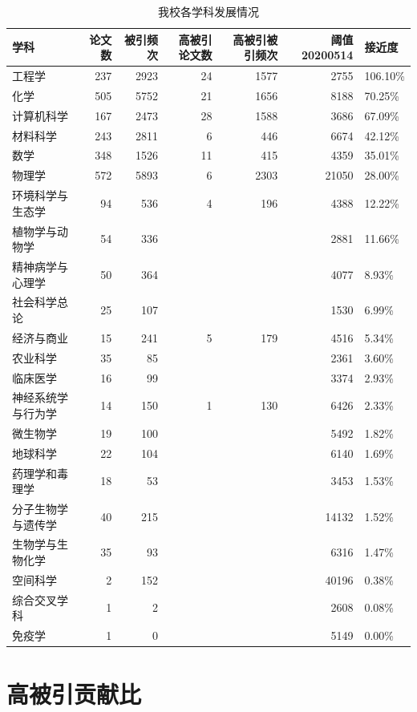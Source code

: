 \documentclass[cn, 11pt, fancy, hide]{elegantbook}
\begin{document}
\begin{table}[!h]

\caption{\label{tab:unnamed-chunk-23}我校各学科发展情况}
\centering
\begin{tabular}[t]{lrrrrrl}
\toprule
学科 & 论文数 & 被引频次 & 高被引论文数 & 高被引被引频次 & 阈值20200514 & 接近度\\
\midrule
工程学 & 237 & 2923 & 24 & 1577 & 2755 & 106.10\%\\
化学 & 505 & 5752 & 21 & 1656 & 8188 & 70.25\%\\
计算机科学 & 167 & 2473 & 28 & 1588 & 3686 & 67.09\%\\
材料科学 & 243 & 2811 & 6 & 446 & 6674 & 42.12\%\\
数学 & 348 & 1526 & 11 & 415 & 4359 & 35.01\%\\
\addlinespace
物理学 & 572 & 5893 & 6 & 2303 & 21050 & 28.00\%\\
环境科学与生态学 & 94 & 536 & 4 & 196 & 4388 & 12.22\%\\
植物学与动物学 & 54 & 336 &  &  & 2881 & 11.66\%\\
精神病学与心理学 & 50 & 364 &  &  & 4077 & 8.93\%\\
社会科学总论 & 25 & 107 &  &  & 1530 & 6.99\%\\
\addlinespace
经济与商业 & 15 & 241 & 5 & 179 & 4516 & 5.34\%\\
农业科学 & 35 & 85 &  &  & 2361 & 3.60\%\\
临床医学 & 16 & 99 &  &  & 3374 & 2.93\%\\
神经系统学与行为学 & 14 & 150 & 1 & 130 & 6426 & 2.33\%\\
微生物学 & 19 & 100 &  &  & 5492 & 1.82\%\\
\addlinespace
地球科学 & 22 & 104 &  &  & 6140 & 1.69\%\\
药理学和毒理学 & 18 & 53 &  &  & 3453 & 1.53\%\\
分子生物学与遗传学 & 40 & 215 &  &  & 14132 & 1.52\%\\
生物学与生物化学 & 35 & 93 &  &  & 6316 & 1.47\%\\
空间科学 & 2 & 152 &  &  & 40196 & 0.38\%\\
\addlinespace
综合交叉学科 & 1 & 2 &  &  & 2608 & 0.08\%\\
免疫学 & 1 & 0 &  &  & 5149 & 0.00\%\\
\bottomrule
\end{tabular}
\end{table}

\hypertarget{ux9ad8ux88abux5f15ux8d21ux732eux6bd4}{%
\section{高被引贡献比}\label{ux9ad8ux88abux5f15ux8d21ux732eux6bd4}}
\end{document}
